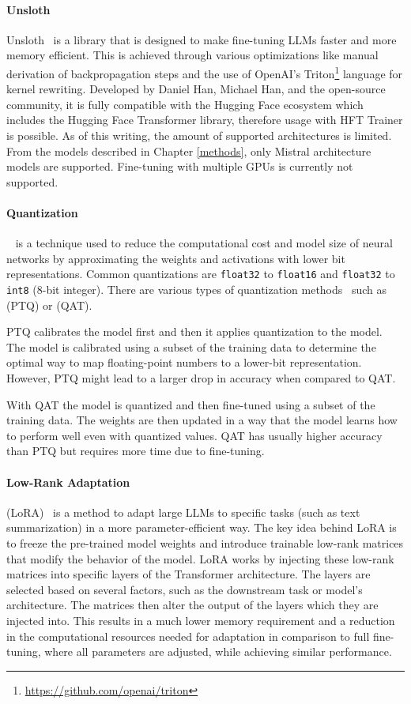\documentclass[english, ba, kiv, he, iso690numb, pdf, viewonly]{fasthesis}
\begin{document}
\paragraph{Unsloth}\label{impl:unsloth}
Unsloth~\cite{unsloth} is a library that is designed to make fine-tuning LLMs faster and more memory efficient. This is achieved through various optimizations like manual derivation of backpropagation steps and the use of OpenAI's Triton\footnote{\url{https://github.com/openai/triton}} language for kernel rewriting. Developed by Daniel Han, Michael Han, and the open-source community, it is fully compatible with the Hugging Face ecosystem which includes the Hugging Face Transformer library, therefore usage with HFT Trainer is possible. As of this writing, the amount of supported architectures is limited. From the models described in Chapter \ref{methods}, only Mistral architecture models are supported. Fine-tuning with multiple GPUs is currently not supported.
\paragraph{Quantization}
~\cite{jacob2017quantization} is a technique used to reduce the computational cost and model size of neural networks by approximating the weights and activations with lower bit representations. Common quantizations are \texttt{float32} to \texttt{float16} and \texttt{float32} to \texttt{int8} (8-bit integer). There are various types of quantization methods~\cite{gholami2021survey} such as  (PTQ) or  (QAT). 

PTQ calibrates the model first and then it applies quantization to the model. The model is calibrated using a subset of the training data to determine the optimal way to map floating-point numbers to a lower-bit representation. However, PTQ might lead to a larger drop in accuracy when compared to QAT.

With QAT the model is quantized and then fine-tuned using a subset of the training data. The weights are then updated in a way that the model learns how to perform well even with quantized values. QAT has usually higher accuracy than PTQ but requires more time due to fine-tuning.
\paragraph{Low-Rank Adaptation}\label{impl:lora}
 (LoRA)~\cite{hu2021lora} is a method to adapt large LLMs to specific tasks (such as text summarization) in a more parameter-efficient way. The key idea behind LoRA is to freeze the pre-trained model weights and introduce trainable low-rank matrices that modify the behavior of the model. LoRA works by injecting these low-rank matrices into specific layers of the Transformer architecture. The layers are selected based on several factors, such as the downstream task or model's architecture. The matrices then alter the output of the layers which they are injected into. This results in a much lower memory requirement and a reduction in the computational resources needed for adaptation in comparison to full fine-tuning, where all parameters are adjusted, while achieving similar performance.
\end{document}
